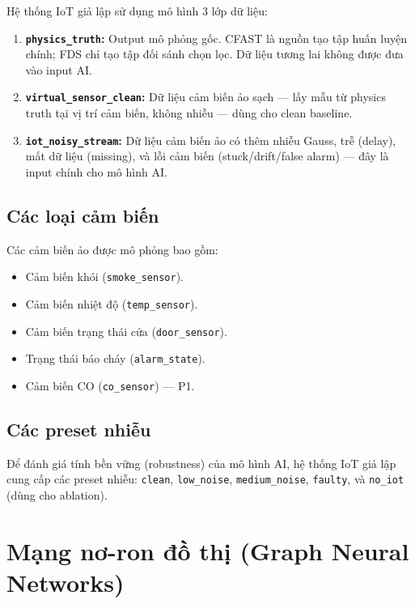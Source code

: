 Hệ thống IoT giả lập sử dụng mô hình 3 lớp dữ liệu:

\begin{enumerate}
  \item \textbf{\texttt{physics\_truth}:} Output mô phỏng gốc. CFAST là nguồn tạo tập huấn luyện chính; FDS chỉ tạo tập đối sánh chọn lọc. Dữ liệu tương lai không được đưa vào input AI.
  \item \textbf{\texttt{virtual\_sensor\_clean}:} Dữ liệu cảm biến ảo sạch — lấy mẫu từ physics truth tại vị trí cảm biến, không nhiễu — dùng cho clean baseline.
  \item \textbf{\texttt{iot\_noisy\_stream}:} Dữ liệu cảm biến ảo có thêm nhiễu Gauss, trễ (delay), mất dữ liệu (missing), và lỗi cảm biến (stuck/drift/false alarm) — đây là input chính cho mô hình AI.
\end{enumerate}

\subsection{Các loại cảm biến}

Các cảm biến ảo được mô phỏng bao gồm:
\begin{itemize}
  \item Cảm biến khói (\texttt{smoke\_sensor}).
  \item Cảm biến nhiệt độ (\texttt{temp\_sensor}).
  \item Cảm biến trạng thái cửa (\texttt{door\_sensor}).
  \item Trạng thái báo cháy (\texttt{alarm\_state}).
  \item Cảm biến CO (\texttt{co\_sensor}) — P1.
\end{itemize}

\subsection{Các preset nhiễu}

Để đánh giá tính bền vững (robustness) của mô hình AI, hệ thống IoT giả lập cung cấp các preset nhiễu: \texttt{clean}, \texttt{low\_noise}, \texttt{medium\_noise}, \texttt{faulty}, và \texttt{no\_iot} (dùng cho ablation).

\section{Mạng nơ-ron đồ thị (Graph Neural Networks)}
\label{sec:gnn}

